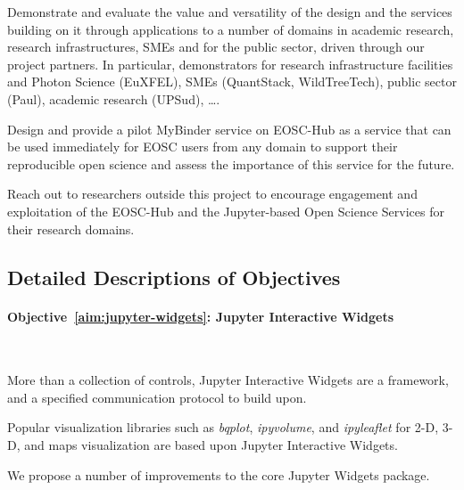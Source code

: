 \begin{compactenum}
\item \label{aim:demonstrators}%
  Demonstrate and evaluate the value and versatility of the design and
  the services building on it through applications to a number of
  domains in academic research, research infrastructures, SMEs and for
  the public sector, driven through our project partners. In
  particular, demonstrators for research infrastructure facilities and
  Photon Science (EuXFEL), SMEs (QuantStack, WildTreeTech), public
  sector (Paul), academic research (UPSud), \ldots.


\item \label{aim:binderservice}%
  Design and provide a pilot MyBinder service on EOSC-Hub as a service
  that can be used immediately for EOSC users from any domain to
  support their reproducible open science and assess the importance of
  this service for the future.

\item \label{aim:outreach-and-engagement}%
  Reach out to researchers outside this project to encourage engagement
  and exploitation of the EOSC-Hub and the Jupyter-based Open Science
  Services for their research domains.


\end{compactenum}

\subsection*{Detailed Descriptions of Objectives}

\paragraph{Objective~\ref{aim:jupyter-widgets}: Jupyter Interactive Widgets}\

More than a collection of controls, Jupyter Interactive Widgets are a
framework, and a specified communication protocol to build upon.

Popular visualization libraries such as \emph{bqplot}, \emph{ipyvolume}, and
\emph{ipyleaflet} for 2-D, 3-D, and maps visualization are based upon Jupyter
Interactive Widgets.

We propose a number of improvements to the core Jupyter Widgets package.

